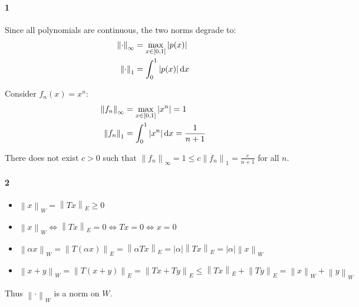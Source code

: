 \documentclass{ctexart}
\begin{document}
\paragraph{1}

Since all polynomials are continuous, the two norms degrade to:
\begin{align*}
    \left\| \cdot \right\|_{\infty } &= \max_{x \in [0,1]} |p(x)| \\
    \left\| \cdot \right\|_{1} &= \int_{0}^{1} |p(x)| \d{x}
\end{align*}

Consider \(f_{n}(x) = x^{n}\):
\begin{align*}
    \left\| f_{n} \right\|_{\infty } &= \max_{x \in [0,1]} |x^{n}| = 1 \\
    \left\| f_{n} \right\|_{1} &= \int_{0}^{1} |x^{n}|\d{x} = \frac{1}{n+1}
\end{align*}

There does not exist \(c > 0\) such that \(\left\| f_{n}
    \right\|_{\infty } = 1 \leq c \left\| f_{n} \right\|_{1} =
\frac{c}{n+1} \) for all \(n\).

\paragraph{2}
\begin{itemize}
    \item \(\left\| x \right\|_{W} = \left\| Tx \right\|_{E} \geq 0\)
    \item \(\left\| x \right\|_{W} \iff \left\| Tx \right\|_{E} = 0
        \iff Tx = 0 \iff x = 0\)
    \item \(\left\| \alpha x \right\|_{W} = \left\| T(\alpha x)
            \right\|_{E} = \left\| \alpha Tx \right\|_{E} = |\alpha|
        \left\| Tx \right\|_{E} = |\alpha| \left\| x \right\|_{W}\)
    \item \(\left\| x + y \right\|_{W} = \left\| T(x + y)
            \right\|_{E} = \left\| Tx + Ty \right\|_{E} \leq
            \left\| Tx \right\|_{E} + \left\| Ty \right\|_{E} =
        \left\| x \right\|_{W} + \left\| y \right\|_{W}\)
\end{itemize}

Thus \(\left\| \cdot \right\|_{W}\) is a norm on \(W\).
\end{document}
